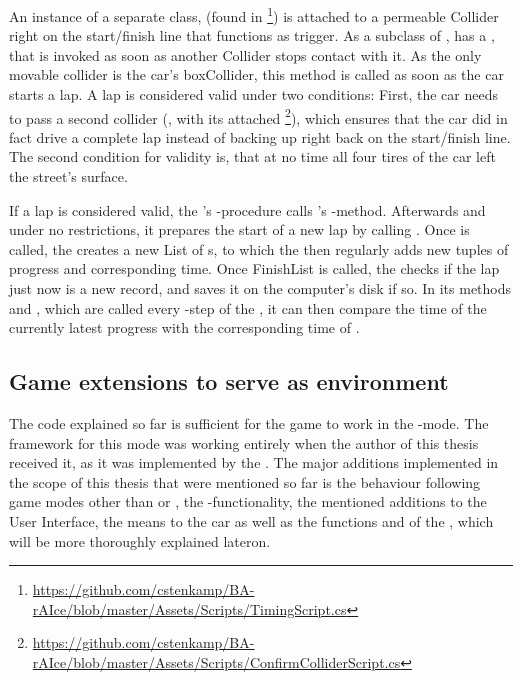 An instance of a separate class,  (found in \footnote{\url{https://github.com/cstenkamp/BA-rAIce/blob/master/Assets/Scripts/TimingScript.cs}}) is attached to a permeable Collider right on the start/finish line that functions as trigger. As a subclass of ,  has a , that is invoked as soon as another Collider stops contact with it. As the only movable collider is the car's boxCollider, this method is called as soon as the car starts a lap. A lap is considered valid under two conditions: First, the car needs to pass a second collider (, with its attached \footnote{\url{https://github.com/cstenkamp/BA-rAIce/blob/master/Assets/Scripts/ConfirmColliderScript.cs}}), which ensures that the car did in fact drive a complete lap instead of backing up right back on the start/finish line. The second condition for validity is, that at no time all four tires of the car left the street's surface.

If a lap is considered valid, the 's -procedure calls 's -method. Afterwards and under no restrictions, it prepares the start of a new lap by calling . Once  is called, the  creates a new List of s, to which the  then regularly adds new tuples of progress and corresponding time. Once FinishList is called, the  checks if the lap just now is a new record, and saves it on the computer's disk if so. In its methods  and , which are called every -step of the , it can then compare the time of the currently latest progress with the corresponding time of . \\

\subsection{Game extensions to serve as environment}

The code explained so far is sufficient for the game to work in the -mode. The framework for this mode was working entirely when the author of this thesis received it, as it was implemented by the \leonbase. The major additions implemented in the scope of this thesis that were mentioned so far is the behaviour following game modes other than  or , the -functionality, the mentioned additions to the User Interface, the means to  the car as well as the functions  and  of the , which will be more thoroughly explained lateron.

